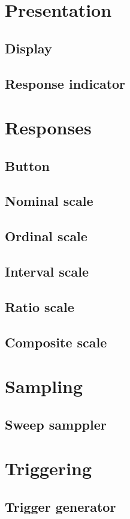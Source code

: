 \section{Presentation}

\subsection{Display}

\subsection{Response indicator}

\section{Responses}

\subsection{Button}

\subsection{Nominal scale}

\subsection{Ordinal scale}

\subsection{Interval scale}

\subsection{Ratio scale}

\subsection{Composite scale}

\section{Sampling}

\subsection{Sweep samppler}

\section{Triggering}

\subsection{Trigger generator}

